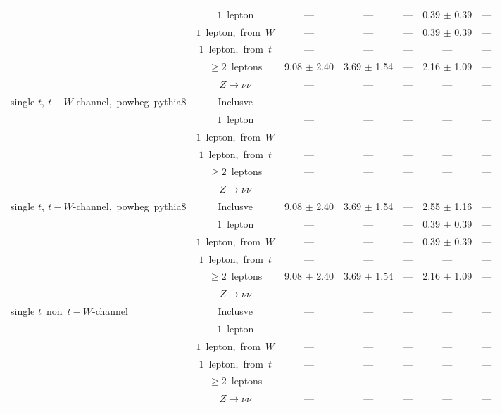 \documentclass{article}
\begin{document}
\begin{longtable}{|l|c|c|c|c|c|c|}
 & $1$~lepton  & ---  & ---  & ---  & 0.39 $\pm$ 0.39  & --- \\* 
 & $1$~lepton,~from~$W$  & ---  & ---  & ---  & 0.39 $\pm$ 0.39  & --- \\* 
 & $1$~lepton,~from~$t$  & ---  & ---  & ---  & ---  & --- \\* 
 & $\ge2$~leptons  & 9.08 $\pm$ 2.40  & 3.69 $\pm$ 1.54  & ---  & 2.16 $\pm$ 1.09  & --- \\* 
 & $Z\rightarrow\nu\nu$  & ---  & ---  & ---  & ---  & --- \\* 
\hline 
\multirow{6}{*}{single $t,~t-W$-channel,~powheg~pythia8} & Inclusve  & ---  & ---  & ---  & ---  & --- \\* 
 & $1$~lepton  & ---  & ---  & ---  & ---  & --- \\* 
 & $1$~lepton,~from~$W$  & ---  & ---  & ---  & ---  & --- \\* 
 & $1$~lepton,~from~$t$  & ---  & ---  & ---  & ---  & --- \\* 
 & $\ge2$~leptons  & ---  & ---  & ---  & ---  & --- \\* 
 & $Z\rightarrow\nu\nu$  & ---  & ---  & ---  & ---  & --- \\* 
\hline 
\multirow{6}{*}{single $\bar{t},~t-W$-channel,~powheg~pythia8} & Inclusve  & 9.08 $\pm$ 2.40  & 3.69 $\pm$ 1.54  & ---  & 2.55 $\pm$ 1.16  & --- \\* 
 & $1$~lepton  & ---  & ---  & ---  & 0.39 $\pm$ 0.39  & --- \\* 
 & $1$~lepton,~from~$W$  & ---  & ---  & ---  & 0.39 $\pm$ 0.39  & --- \\* 
 & $1$~lepton,~from~$t$  & ---  & ---  & ---  & ---  & --- \\* 
 & $\ge2$~leptons  & 9.08 $\pm$ 2.40  & 3.69 $\pm$ 1.54  & ---  & 2.16 $\pm$ 1.09  & --- \\* 
 & $Z\rightarrow\nu\nu$  & ---  & ---  & ---  & ---  & --- \\* 
\hline 
\multirow{6}{*}{single $t$~non~$t-W$-channel} & Inclusve  & ---  & ---  & ---  & ---  & --- \\* 
 & $1$~lepton  & ---  & ---  & ---  & ---  & --- \\* 
 & $1$~lepton,~from~$W$  & ---  & ---  & ---  & ---  & --- \\* 
 & $1$~lepton,~from~$t$  & ---  & ---  & ---  & ---  & --- \\* 
 & $\ge2$~leptons  & ---  & ---  & ---  & ---  & --- \\* 
 & $Z\rightarrow\nu\nu$  & ---  & ---  & ---  & ---  & --- \\* 

\end{longtable}
\end{document}
